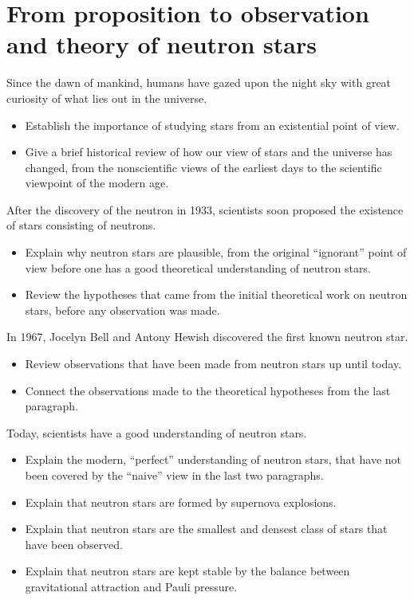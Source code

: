 \section{From proposition to observation and theory of neutron stars}


Since the dawn of mankind, humans have gazed upon the night sky with great curiosity of what lies out in the universe.
\begin{itemize}
\item Establish the importance of studying stars from an existential point of view.
\item Give a brief historical review of how our view of stars and the universe has changed, from the nonscientific views of the earliest days to the scientific viewpoint of the modern age.
\end{itemize}

After the discovery of the neutron in 1933, scientists soon proposed the existence of stars consisting of neutrons.
\begin{itemize}
\item Explain why neutron stars are plausible, from the original ``ignorant'' point of view before one has a good theoretical understanding of neutron stars.
\item Review the hypotheses that came from the initial theoretical work on neutron stars, before any observation was made.
\end{itemize}

In 1967, Jocelyn Bell and Antony Hewish discovered the first known neutron star.
\begin{itemize}
\item Review observations that have been made from neutron stars up until today.
\item Connect the observations made to the theoretical hypotheses from the last paragraph.
\end{itemize}

Today, scientists have a good understanding of neutron stars.
\begin{itemize}
\item Explain the modern, ``perfect'' understanding of neutron stars, that have not been covered by the ``naive'' view in the last two paragraphs.
\item Explain that neutron stars are formed by supernova explosions.
\item Explain that neutron stars are the smallest and densest class of stars that have been observed.
\item Explain that neutron stars are kept stable by the balance between gravitational attraction and Pauli pressure.
\end{itemize}

